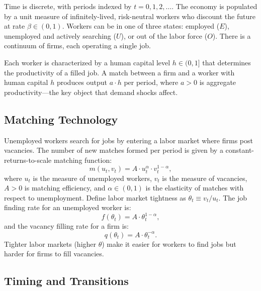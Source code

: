 \documentclass[12pt]{article}
\begin{document}
Time is discrete, with periods indexed by $t = 0, 1, 2, \ldots$. The economy is populated by a unit measure of infinitely-lived, risk-neutral workers who discount the future at rate $\beta \in (0,1)$. Workers can be in one of three states: employed ($E$), unemployed and actively searching ($U$), or out of the labor force ($O$). There is a continuum of firms, each operating a single job.

Each worker is characterized by a human capital level $h \in (0,1]$ that determines the productivity of a filled job. A match between a firm and a worker with human capital $h$ produces output $a \cdot h$ per period, where $a > 0$ is aggregate productivity---the key object that demand shocks affect.

\subsection{Matching Technology}

Unemployed workers search for jobs by entering a labor market where firms post vacancies. The number of new matches formed per period is given by a constant-returns-to-scale matching function:
\begin{equation}
m(u_t, v_t) = A \cdot u_t^{\alpha} \cdot v_t^{1 - \alpha},
\label{eq:matching}
\end{equation}
where $u_t$ is the measure of unemployed workers, $v_t$ is the measure of vacancies, $A > 0$ is matching efficiency, and $\alpha \in (0,1)$ is the elasticity of matches with respect to unemployment. Define labor market tightness as $\theta_t \equiv v_t / u_t$. The job finding rate for an unemployed worker is:
\begin{equation}
f(\theta_t) = A \cdot \theta_t^{1 - \alpha},
\label{eq:jobfinding}
\end{equation}
and the vacancy filling rate for a firm is:
\begin{equation}
q(\theta_t) = A \cdot \theta_t^{-\alpha}.
\label{eq:vacfilling}
\end{equation}
Tighter labor markets (higher $\theta$) make it easier for workers to find jobs but harder for firms to fill vacancies.

\subsection{Timing and Transitions}
\end{document}
